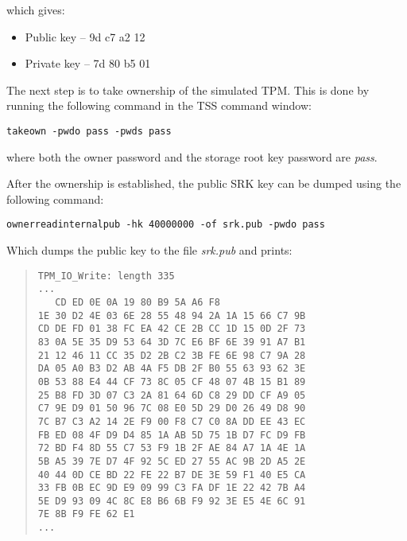\documentclass[10pt]{article}
\newcommand{\command}[1]{\texttt{#1}}
\begin{document}
      which gives:

      \begin{itemize}
        \item{Public key -- 9d c7 a2 12}
        \item{Private key -- 7d 80 b5 01}
      \end{itemize}

      The next step is to take ownership of the simulated TPM. This is done by
      running the following command in the TSS command window:

      \command{takeown -pwdo pass -pwds pass}

      where both the owner password and
      the storage root key password are \textit{pass}.

      After the ownership is established, the public SRK key can be dumped using
      the following command:

      \command{ownerreadinternalpub -hk 40000000 -of srk.pub -pwdo
      pass}

      Which dumps the public key to the file \textit{srk.pub} and prints:

      \begin{quote}
        \texttt{TPM\_IO\_Write: length 335\\
        ...\\
        \ \ \ CD ED 0E 0A 19 80 B9 5A A6 F8 \\
    1E 30 D2 4E 03 6E 28 55 48 94 2A 1A 15 66 C7 9B \\
    CD DE FD 01 38 FC EA 42 CE 2B CC 1D 15 0D 2F 73 \\
    83 0A 5E 35 D9 53 64 3D 7C E6 BF 6E 39 91 A7 B1 \\
    21 12 46 11 CC 35 D2 2B C2 3B FE 6E 98 C7 9A 28 \\
    DA 05 A0 B3 D2 AB 4A F5 DB 2F B0 55 63 93 62 3E \\
    0B 53 88 E4 44 CF 73 8C 05 CF 48 07 4B 15 B1 89 \\
    25 B8 FD 3D 07 C3 2A 81 64 6D C8 29 DD CF A9 05 \\
    C7 9E D9 01 50 96 7C 08 E0 5D 29 D0 26 49 D8 90 \\
    7C B7 C3 A2 14 2E F9 00 F8 C7 C0 8A DD EE 43 EC \\
    FB ED 08 4F D9 D4 85 1A AB 5D 75 1B D7 FC D9 FB \\
    72 BD F4 8D 55 C7 53 F9 1B 2F AE 84 A7 1A 4E 1A \\
    5B A5 39 7E D7 4F 92 5C ED 27 55 AC 9B 2D A5 2E \\
    40 44 0D CE BD 22 FE 22 B7 DE 3E 59 F1 40 E5 CA \\
    33 FB 0B EC 9D E9 09 99 C3 FA DF 1E 22 42 7B A4 \\
    5E D9 93 09 4C 8C E8 B6 6B F9 92 3E E5 4E 6C 91 \\
    7E 8B F9 FE 62 E1 \\
    ...
       }
      \end{quote}
\end{document}
